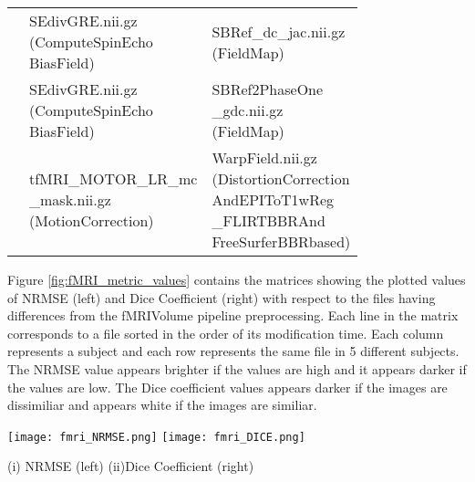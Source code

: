 \begin{center}
\begin{longtable}{|p{}|p{}|p{}|}
& \makecell[l]{SEdivGRE.nii.gz\\(ComputeSpinEcho\\BiasField)}                         & \makecell[l]{SBRef\_dc\_jac.nii.gz\\(FieldMap)} \\\cline{2-3}
& \makecell[l]{SEdivGRE.nii.gz\\(ComputeSpinEcho\\BiasField)}                         & \makecell[l]{SBRef2PhaseOne\\\_gdc.nii.gz\\(FieldMap)} \\\cline{2-3}
& \makecell[l]{tfMRI\_MOTOR\_LR\_mc\\\_mask.nii.gz\\(MotionCorrection)}               & \makecell[l]{WarpField.nii.gz\\(DistortionCorrection\\AndEPIToT1wReg\\\_FLIRTBBRAnd\\FreeSurferBBRbased)} \\\cline{1-3}
\end{longtable}
\label{tab:fMRIVolume_comparison_table}
\end{center}
\hfill \break
\fi

Figure \ref{fig:fMRI_metric_values} contains the matrices showing the plotted values of NRMSE (left) and Dice Coefficient (right) with respect to the files having differences from the fMRIVolume pipeline preprocessing. Each line in the matrix corresponds to a file sorted in the order of its modification time. Each column represents a subject and each row represents the same file in 5 different subjects. The NRMSE value appears brighter if the values are high and it appears darker if the values are low. The Dice coefficient values appears darker if the images are dissimiliar and appears white if the images are similiar.
\hfill \break
\begin{center}
\texttt{[image: fmri\_NRMSE.png]}%
\texttt{[image: fmri\_DICE.png]}
\caption*{(i) NRMSE (left) (ii)Dice Coefficient (right)}
\label{fig:fMRI_metric_values}
\end{center}
\hfill \break

